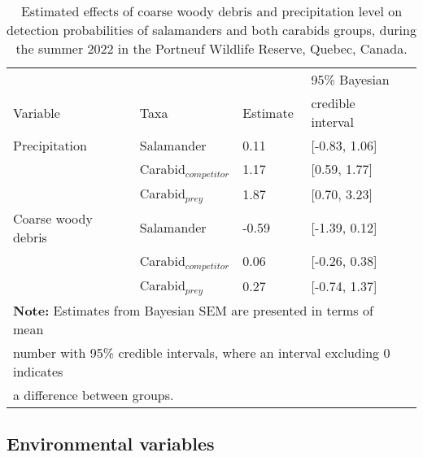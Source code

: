 \begin{table}[ht]
  \centering
  \caption[Estimated effects of coarse woody debris and precipitation level on detection probabilities of salamanders and both carabids groups.]
  {Estimated effects of coarse woody debris and precipitation level on detection probabilities of salamanders and both carabids groups, during the summer 2022 in the Portneuf Wildlife Reserve,  Quebec, Canada.}
  \label{tab:detection}
  \begin{tabular}{lllll} 
      \hline
      &&&95\% Bayesian \\
      Variable & Taxa & Estimate &  credible interval \\ [0.5ex] 
      \hline      
      Precipitation       & Salamander              & \hspace{1mm}0.11 & [-0.83, 1.06] \\ 
                          & Carabid$_{competitor}$  & \hspace{1mm}1.17 & [0.59, 1.77] \\ 
                          & Carabid$_{prey}$        & \hspace{1mm}1.87 & [0.70, 3.23] \\  
      \hline      
      Coarse woody debris & Salamander              & -0.59 & [-1.39, 0.12] \\ 
                          & Carabid$_{competitor}$  & \hspace{1mm}0.06 & [-0.26, 0.38] \\ 
                          & Carabid$_{prey}$        & \hspace{1mm}0.27 & [-0.74, 1.37] \\   

      \hline
      \multicolumn{4}{l}{\textbf{Note:} Estimates from Bayesian SEM are presented in terms of mean} \\
      \multicolumn{4}{l}{number with 95\% credible intervals, where an interval excluding 0 indicates} \\
      \multicolumn{4}{l}{a difference between groups.} \\
  \end{tabular}
\end{table}


\subsection*{Environmental variables}
\label{subsec:ResEnv}

